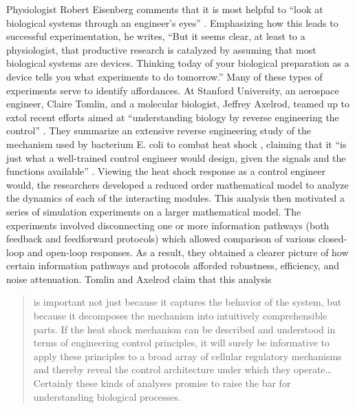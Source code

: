 Physiologist Robert Eisenberg comments that it is most helpful to “look
at biological systems through an engineer’s eyes” \citep[][p.~376]{eisenberg2007}.
Emphasizing how this leads to successful experimentation, he writes,
“But it seems clear, at least to a physiologist, that productive
research is catalyzed by assuming that most biological systems are
devices. Thinking today of your biological preparation as a device
tells you what experiments to do tomorrow.” Many of these types of
experiments serve to identify affordances. At Stanford University, an
aerospace engineer, Claire Tomlin, and a molecular biologist, Jeffrey
Axelrod, teamed up to extol recent efforts aimed at
``understanding biology by reverse engineering the
control'' \citep[][pp. 4219--4220]{tomlinaxelrod2005}. They summarize an extensive reverse
engineering study of the mechanism used by bacterium E. coli to combat
heat shock \citep{elsamadetal2005}, claiming that it “is just what a
well-trained control engineer would design, given the signals and the
functions available” \citep[][4219]{tomlinaxelrod2005}. Viewing the heat shock response as a control
engineer would, the researchers developed a reduced order mathematical
model to analyze the dynamics of each of the interacting modules. This
analysis then motivated a series of simulation experiments on a larger
mathematical model. The experiments involved disconnecting one or more
information pathways (both feedback and feedforward protocols) which
allowed comparison of various closed-loop and open-loop responses. As a
result, they obtained a clearer picture of how certain information
pathways and protocols afforded robustness, efficiency, and noise
attenuation. Tomlin and Axelrod claim that this analysis 

\begin{quote}
is important
not just because it captures the behavior of the system, but because it
decomposes the mechanism into intuitively comprehensible parts. If the
heat shock mechanism can be described and understood in terms of
engineering control principles, it will surely be informative to apply
these principles to a broad array of cellular regulatory mechanisms and
thereby reveal the control architecture under which they
operate{\ldots}Certainly these kinds of analyses promise to raise the bar for
understanding biological processes.
\end{quote}

